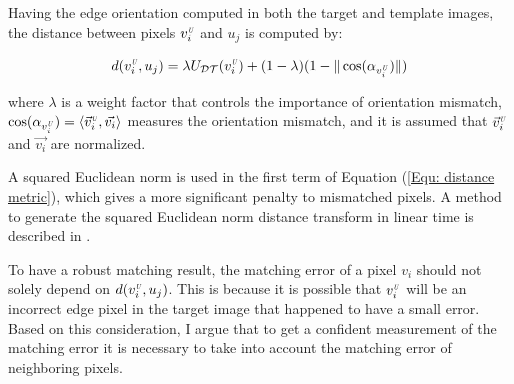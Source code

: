 \documentclass{iitthesis}
\begin{document}
Having the edge orientation computed in both the target and template images, the distance between pixels ${v}_i^{\scalebox{.5}{\textit{U}}}$ and $u_j$ is computed by:

\begin{equation}
d(v_i^{\scalebox{.5}{\textit{U}}}, u_j)=\lambda U_{\mathcal{DT}}(v_i^{\scalebox{.5}{\textit{U}}}) + (1-\lambda)(1- \|\cos(\alpha_{v_i^{\scalebox{.5}{\textit{U}}}})\|)
\label{Equ: distance metric}
\end{equation}

where $\lambda$ is a weight factor that controls the importance of orientation mismatch, $\cos(\alpha_{v_i^{\scalebox{.5}{\textit{U}}}})=\langle{\vec{v}_i^{\scalebox{.5}{\textit{U}}}}, \vec{v_i} \rangle$ measures the orientation mismatch, and it is assumed that $\vec{v}_i^{\scalebox{.5}{\textit{U}}}$ and $\vec{v_i}$ are normalized.

A squared Euclidean norm is used in the first term of Equation (\ref{Equ: distance metric}), which gives a more significant penalty to mismatched pixels. A method to generate the squared Euclidean norm distance transform in linear time is described in \cite{PF:04}.

 To have a robust matching result, the matching error of a pixel $v_i$ should not solely depend on $d(v_i^{\scalebox{.5}{\textit{U}}}, u_j)$. This is because it is possible that $v_i^{\scalebox{.5}{\textit{U}}}$ will be an incorrect edge pixel in the target image that happened to have a small error. Based on this consideration, I argue that to get a confident measurement of the matching error it is necessary to take into account the matching error of neighboring pixels.
\end{document}
